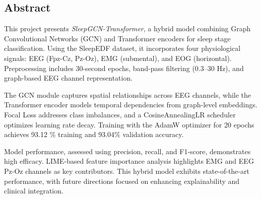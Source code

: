 \begin{center}
\section*{\textcolor{internationalkleinblue}{\textbf{{Abstract}}}}
\end{center} 
This project presents \textit{SleepGCN-Transformer}, a hybrid model combining Graph Convolutional Networks (GCN) and Transformer encoders for sleep stage classification. Using the SleepEDF dataset, it incorporates four physiological signals: EEG (Fpz-Cz, Pz-Oz), EMG (submental), and EOG (horizontal). Preprocessing includes 30-second epochs, band-pass filtering (0.3--30 Hz), and graph-based EEG channel representation.

The GCN module captures spatial relationships across EEG channels, while the Transformer encoder models temporal dependencies from graph-level embeddings. Focal Loss addresses class imbalances, and a CosineAnnealingLR scheduler optimizes learning rate decay. Training with the AdamW optimizer for 20 epochs achieves 93.12 \% training and 93.04\% validation accuracy.

Model performance, assessed using precision, recall, and F1-score, demonstrates high efficacy. LIME-based feature importance analysis highlights EMG and EEG Pz-Oz channels as key contributors. This hybrid model exhibits state-of-the-art performance, with future directions focused on enhancing explainability and clinical integration.